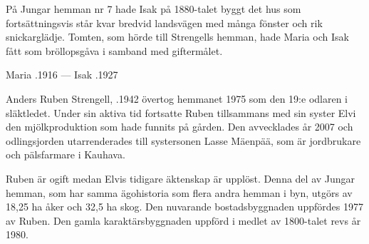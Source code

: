 På Jungar hemman nr 7 hade Isak på 1880-talet byggt det hus som fortsättningsvis står kvar bredvid landsvägen med många fönster och rik snickarglädje. Tomten, som hörde till Strengells hemman, hade Maria och Isak fått som bröllopsgåva i samband med giftermålet.
\begin{jhchildren}
  \item {}
  \item {}
  \item {}
  \item {}
  \item {}
  \item {}
  \item {}
  \item {}
  \item {}
  \item {}
  \item {}
\end{jhchildren}

Maria .1916  ---  Isak .1927



%



%
Anders Ruben Strengell, .1942 övertog hemmanet 1975 som den 19:e odlaren i släktledet. Under sin aktiva tid fortsatte Ruben tillsammans med sin syster Elvi den mjölkproduktion som hade funnits på gården. Den avvecklades år 2007 och odlingsjorden utarrenderades till systersonen Lasse Mäenpää, som är jordbrukare och pälsfarmare i Kauhava.

Ruben är ogift medan Elvis tidigare äktenskap är upplöst. Denna del av Jungar hemman, som har samma ägohistoria som flera andra hemman i byn, utgörs av 18,25 ha åker och 32,5 ha skog. Den nuvarande bostadsbyggnaden uppfördes 1977 av Ruben. Den gamla karaktärsbyggnaden uppförd i medlet av 1800-talet revs år 1980.


